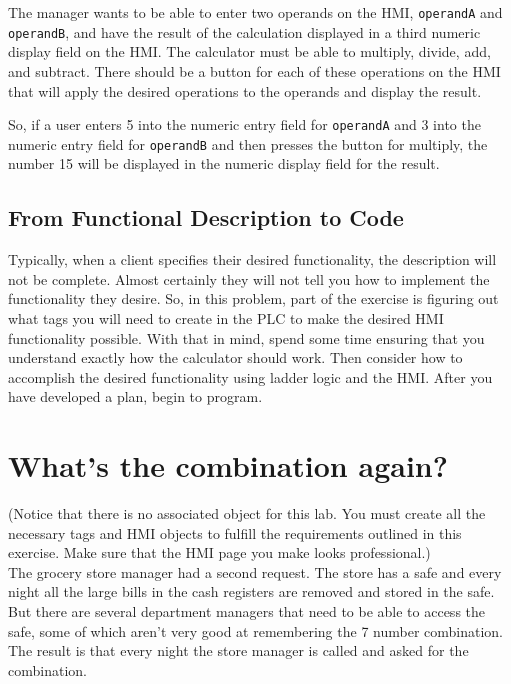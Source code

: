 The manager wants to be able to enter two operands on the HMI, \verb|operandA| and \verb|operandB|, and have the result of the calculation displayed in a third numeric display field on the HMI. The calculator must be able to multiply, divide, add, and subtract. There should be a button for each of these operations on the HMI that will apply the desired operations to the operands and display the result.

So, if a user enters 5 into the numeric entry field for \verb|operandA| and 3 into the numeric entry field for \verb|operandB| and then presses the button for multiply, the number 15 will be displayed in the numeric display field for the result. 

 
\subsection{From Functional Description to Code}


Typically, when a client specifies their desired functionality, the description will not be complete. Almost certainly they will not tell you how to implement the functionality they desire. So, in this problem, part of the exercise is figuring out what tags you will need to create in the PLC to make the desired HMI functionality possible. With that in mind, spend some time ensuring that you understand exactly how the calculator should work. Then consider how to accomplish the desired functionality using ladder logic and the HMI. After you have developed a plan, begin to program.

\TASignatureSlot



\section{What's the combination again?}
(Notice that there is no associated object for this lab. You must create all the necessary tags and HMI objects to fulfill the requirements outlined in this exercise. Make sure that the HMI page you make looks professional.)
\\


The grocery store manager had a second request. The store has a safe and every night all the large bills in the cash registers are removed and stored in the safe. But there are several department managers that need to be able to access the safe, some of which aren't very good at remembering the 7 number combination. The result is that every night the store manager is called and asked for the combination.

